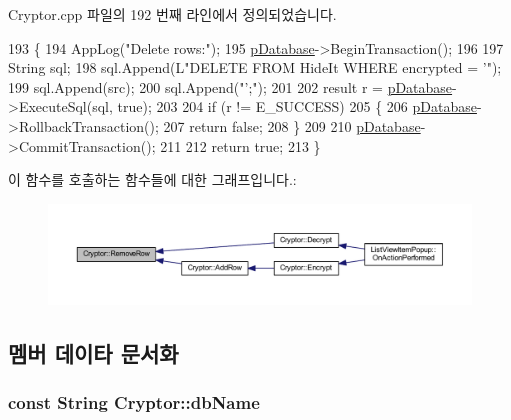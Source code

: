 Cryptor.\+cpp 파일의 192 번째 라인에서 정의되었습니다.


\begin{DoxyCode}
193 \{
194     AppLog(\textcolor{stringliteral}{"Delete rows:"});
195     \hyperlink{class_cryptor_af995ba24eee0b7d4b12dbc1eaae049fd}{pDatabase}->BeginTransaction();
196 
197     String sql;
198     sql.Append(L\textcolor{stringliteral}{"DELETE FROM HideIt WHERE encrypted = '"});
199     sql.Append(src);
200     sql.Append(\textcolor{stringliteral}{"';"});
201 
202     result r = \hyperlink{class_cryptor_af995ba24eee0b7d4b12dbc1eaae049fd}{pDatabase}->ExecuteSql(sql, \textcolor{keyword}{true});
203 
204     \textcolor{keywordflow}{if} (r != E\_SUCCESS)
205     \{
206         \hyperlink{class_cryptor_af995ba24eee0b7d4b12dbc1eaae049fd}{pDatabase}->RollbackTransaction();
207         \textcolor{keywordflow}{return} \textcolor{keyword}{false};
208     \}
209 
210     \hyperlink{class_cryptor_af995ba24eee0b7d4b12dbc1eaae049fd}{pDatabase}->CommitTransaction();
211 
212     \textcolor{keywordflow}{return} \textcolor{keyword}{true};
213 \}
\end{DoxyCode}


이 함수를 호출하는 함수들에 대한 그래프입니다.\+:
\nopagebreak
\begin{figure}[H]
\begin{center}
\leavevmode
\includegraphics[width=350pt]{class_cryptor_ae50f83111c55db7ea7b2052854bb6bb5_icgraph}
\end{center}
\end{figure}




\subsection{멤버 데이타 문서화}
\hypertarget{class_cryptor_a631efae25eefeee21503de08c1a05f31}{
\subsubsection[{db\+Name}]{\setlength{\rightskip}{0pt plus 5cm}const String Cryptor\+::db\+Name\hspace{0.3cm}{\ttfamily [private]}}}\label{class_cryptor_a631efae25eefeee21503de08c1a05f31}



